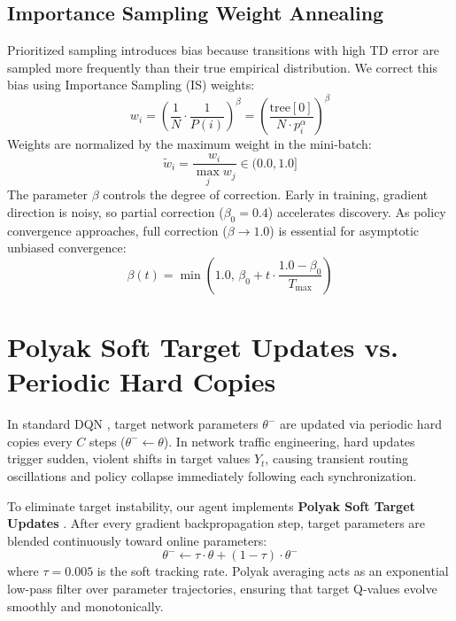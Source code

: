 \subsection{Importance Sampling Weight Annealing}
Prioritized sampling introduces bias because transitions with high TD error are sampled more frequently than their true empirical distribution. We correct this bias using Importance Sampling (IS) weights:
\begin{equation}
    w_i = \left( \frac{1}{N} \cdot \frac{1}{P(i)} \right)^\beta = \left( \frac{\text{tree}[0]}{N \cdot p_i^\alpha} \right)^\beta
\end{equation}
Weights are normalized by the maximum weight in the mini-batch:
\begin{equation}
    \tilde{w}_i = \frac{w_i}{\max_j w_j} \in (0.0, 1.0]
\end{equation}
The parameter $\beta$ controls the degree of correction. Early in training, gradient direction is noisy, so partial correction ($\beta_0 = 0.4$) accelerates discovery. As policy convergence approaches, full correction ($\beta \to 1.0$) is essential for asymptotic unbiased convergence:
\begin{equation}
    \beta(t) = \min\left(1.0, \, \beta_0 + t \cdot \frac{1.0 - \beta_0}{T_{\text{max}}}\right)
\end{equation}

\section{Polyak Soft Target Updates vs. Periodic Hard Copies}
In standard DQN \cite{mnih2015human}, target network parameters $\theta^-$ are updated via periodic hard copies every $C$ steps ($\theta^- \gets \theta$). In network traffic engineering, hard updates trigger sudden, violent shifts in target values $Y_t$, causing transient routing oscillations and policy collapse immediately following each synchronization.

To eliminate target instability, our agent implements \textbf{Polyak Soft Target Updates} \cite{lillicrap2015continuous}. After every gradient backpropagation step, target parameters are blended continuously toward online parameters:
\begin{equation}
    \theta^- \gets \tau \cdot \theta + (1 - \tau) \cdot \theta^-
    \label{eq:polyak_update}
\end{equation}
where $\tau = 0.005$ is the soft tracking rate. Polyak averaging acts as an exponential low-pass filter over parameter trajectories, ensuring that target Q-values evolve smoothly and monotonically.

